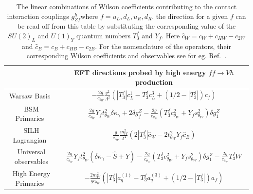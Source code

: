\documentclass[../report.tex]{subfiles}
\begin{document}
\begin{table}[!t]
\begin{center}
\small
\begin{tabular}{|c|c|}%
\hline
&EFT directions probed by high energy $ff \to Vh$ production \\
\hline
\hline
 Warsaw Basis~\cite{Grzadkowski:2010es} & $- \frac{2 g}{c_{\theta_W}}\frac{v^2}{\Lambda^2}(|T_3^f|c^{1}_L-T_3^f c^{3}_L+(1/2-|T_3^f|)c_f)$\\
BSM Primaries~\cite{Gupta:2014rxa} &$   \frac{2 g}{c_{\theta_W}}Y_f t_{\theta_W}^2 \delta \kappa_\gamma+2 \delta g^Z_{f}- \frac{2 g}{c_{\theta_W}}(T^f_3 c_{\theta_W}^2 + Y_f s_{\theta_W}^2)\delta g_1^Z $\\
 SILH Lagrangian~\cite{Giudice:2007fh} &$  \frac{g}{c_{\theta_W}}\frac{m_W^2}{\Lambda^2}(2 |T_3^f|\hat{c}_W-2t_{\theta_W}^2 Y_f \hat{c}_B)$\\
 Universal observables &$ \frac{2 g}{c_{\theta_W}}Y_f t_{\theta_W}^2  (\delta \kappa_\gamma-\hat{S}+Y)- \frac{2 g}{c_{\theta_W}}(T^f_3 c_{\theta_W}^2 + Y_f s_{\theta_W}^2)\delta g_1^Z- \frac{2 g}{c_{\theta_W}}T^f_3 W$\\
 High Energy Primaries~\cite{Franceschini:2017xkh} &$ -\frac{2 m_W^2}{g c_{\theta_W} }(|T_3^f| a_q^{(1)}-T_3^f a_q^{(3)}+(1/2-|T_3^f|)a_f)$\\
\hline
 \end{tabular}
  \caption{ The linear combinations of Wilson coefficients contributing to the contact interaction couplings $g^h_{Zf}$where  $f=u_L, d_L, u_R, d_R$. the direction for a given $f$  can  be read off from this table by substituting the corresponding  value of the $SU(2)_L$ and $U(1)_Y$ quantum numbers  $T_3^f$ and $Y_f$. Here $\hat{c}_W=c_W+c_{HW}-c_{2W}$ and $\hat{c}_B= c_B+c_{HB}-c_{2B}$. For the nomenclature of the operators, their corresponding Wilson coefficients and observables see for eg. Ref.~\cite{Franceschini:2017xkh}.}
  \label{dirn}
\end{center}
\end{table}

\end{document}
